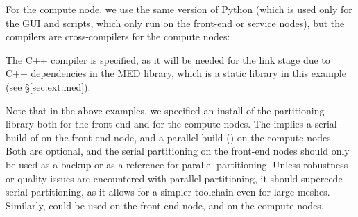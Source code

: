 \documentclass[a4paper,10pt,twoside]{csshortdoc}
\begin{document}
For the compute node, we use the same version of Python (which
is used only for the GUI and scripts, which only run on the front-end
or service nodes), but the compilers are cross-compilers for the
compute nodes:


The C++ compiler is specified, as it will be needed for
the link stage due to C++ dependencies in the MED library,
which is a static library in this example (see \S\ref{sec:ext:med}).

Note that in the above examples, we specified an install of the \scotch
partitioning library both for the front-end and for the compute nodes.
The implies a serial build of \scotch on the front-end node, and a parallel
build (\ptscotch) on the compute nodes. Both are optional, and the
serial partitioning on the front-end nodes should only be used as a
backup or as a reference for parallel partitioning. Unless robustness
or quality issues are encountered with parallel partitioning, it
should supercede serial partitioning, as it allows for a simpler
toolchain even for large meshes.
Similarly, \metis could be used on the front-end node, and \parmetis
on the compute nodes.
\end{document}
